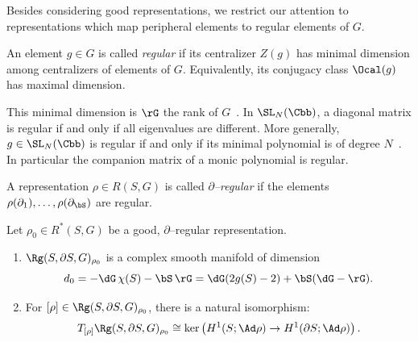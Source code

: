 Besides considering good representations, we restrict our attention to representations which map peripheral elements to regular elements of $G$.

\begin{defi}\label{Definition:regular}
An element $g\in G$ is called \emph{regular} if its centralizer $Z(g)$ has minimal dimension among centralizers of elements of $G$. Equivalently, its conjugacy class $\Ocal(g)$ has maximal dimension.
\end{defi}

This minimal dimension is $\rG$ the rank of $G$~\cite[Section~3.5, Proposition~1]{Steinberg}. In $\SL_N (\Cbb)$, a diagonal matrix is regular if and only if all eigenvalues are different. More generally, $g\in\SL_N (\Cbb)$ is regular if and only if its minimal polynomial is of degree $N$~\cite[Section~3.5, Proposition~2]{Steinberg}. In particular the companion matrix of a monic polynomial is regular.

\begin{defi}\label{Definition:partialregular}
A representation $\rho\in R(S,G)$ is called \emph{$\partial$--regular} if the elements $\rho(\partial_1),\dotsc,\rho(\partial_\bS)$ are regular.
\end{defi}


\begin{prop}\label{prop:relsmooth}
Let $\rho_0\in R^*(S,G)$ be a good, $\partial$--regular representation.
\begin{enumerate}\alphenumi
\item $\Rg(S,\partial S, G)_{\rho_0}$ is a complex smooth manifold of dimension
\[
d_0=-\dG\,\chi(S)-\bS\, \rG = \dG (2 g(S) -2)+\bS (\dG-\rG).
\]
\item For $[\rho]\in \Rg(S,\partial S, G)_{\rho_0} $, there is a natural isomorphism:
\[
T_{[\rho]} \Rg(S,\partial S, G)_{\rho_0}\cong\ker \left(H^1(S;\Ad \rho)\to H^1(\partial S;\Ad\rho)\right).
\]
\end{enumerate}
\end{prop}



